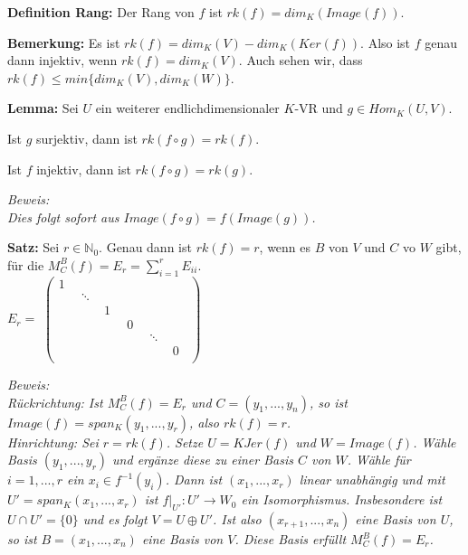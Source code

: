 \documentclass[11pt]{article}
\begin{document}
		\begin{mdframed}[backgroundcolor=blue!20]
			\textbf{Definition Rang:} Der Rang von $f$ ist $rk(f)=dim_K(Image(f))$.
		\end{mdframed}
		
		\textbf{Bemerkung:} Es ist $rk(f)=dim_K(V)-dim_K(Ker(f))$. Also ist $f$ genau dann injektiv, wenn $rk(f)=dim_K(V)$. Auch sehen wir, 
		dass $rk(f)\le min\{dim_K(V),dim_K(W)\}$.
		
		\begin{framed}
			\textbf{Lemma:} Sei $U$ ein weiterer endlichdimensionaler $K$-VR und $g\in Hom_K(U,V)$.
			\begin{compactitem}
				\item Ist $g$ surjektiv, dann ist $rk(f\circ g)=rk(f)$.
				\item Ist $f$ injektiv, dann ist $rk(f\circ g)=rk(g)$.
			\end{compactitem}
		\end{framed}
		\textit{Beweis: \\
		Dies folgt sofort aus $Image(f\circ g)=f(Image(g))$.}
		
		\begin{framed}
			\textbf{Satz:} Sei $r\in \mathbb N_0$. Genau dann ist $rk(f)=r$, wenn es $B$ von $V$ und $C$ vo $W$ gibt, für die $M_C^B(f)=E_r=
			\sum\limits_{i=1}^r E_{ii}$. \\ $E_r=$
			$\begin{pmatrix}
				1 & \quad & \quad & \quad & \quad & \quad\\
				\quad & \ddots & \quad & \quad & \quad & \quad\\
				\quad & \quad & 1 & \quad & \quad & \quad\\
				\quad & \quad & \quad & 0 & \quad & \quad\\
				\quad & \quad & \quad & \quad & \ddots & \quad\\
				\quad & \quad & \quad & \quad & \quad & 0\\
			\end{pmatrix}$
		\end{framed}
		\textit{Beweis: \\
		Rückrichtung: Ist $M_C^B(f)=E_r$ und $C=(y_1,...,y_n)$, so ist $Image(f)=span_K(y_1,...,y_r)$, also $rk(f)=r$. \\
		Hinrichtung: Sei $r=rk(f)$. Setze $U=KJer(f)$ und $W=Image(f)$. Wähle Basis $(y_1,...,y_r)$ und ergänze diese zu einer Basis $C$ von 
		$W$. Wähle für $i=1,...,r$ ein $x_i\in f^{-1}(y_i)$. Dann ist $(x_1,...,x_r)$ linear unabhängig und mit $U'=span_K(x_1,...,x_r)$ ist
		$f|_{U'}:U'\to W_0$ ein Isomorphismus. Insbesondere ist $U\cap U'=\{0\}$ und es folgt $V=U\oplus U'$. Ist also $(x_{r+1},...,x_n)$ 
		eine Basis von $U$, so ist $B=(x_1,...,x_n)$ eine Basis von $V$. Diese Basis erfüllt $M_C^B(f)=E_r$.}
		
\end{document}
